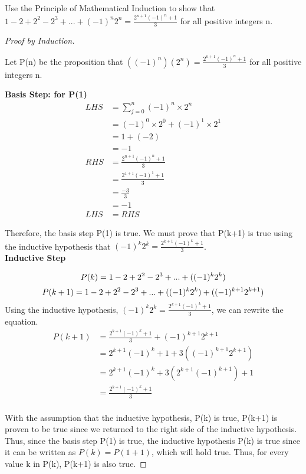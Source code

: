 \documentclass[12pt]{article}
\newenvironment{exercise}[2][Exercise]{\begin{trivlist}
\item[\hskip \labelsep {\bfseries #1}\hskip \labelsep {\bfseries #2.}]}{\end{trivlist}}
\begin{document}
\begin{exercise}{4}
Use the Principle of Mathematical Induction to show that $1 - 2+2^2 - 2^3 + ... + (-1)^n 2^n = \frac{2^{n+1} (-1)^n +1}{3}$ for all positive integers n.
\end{exercise}

\begin{proof}[Proof by Induction]
\textbf{\\}

Let P(n) be the proposition that $((-1)^n)(2^n) = \frac{2^{n+1} (-1)^n +1}{3}$ for all positive integers n. 

\textbf{Basis Step: for P(1)} 
\begin{align*}
LHS &= \sum_{j=0}^{n}(-1)^n \times 2^n \\
&= (-1)^0 \times 2^0 + (-1)^1 \times 2^1 \\
&= 1 + (-2) \\
&= -1 \\
RHS &= \frac{2^{n+1}(-1)^n +1}{3} \\
&= \frac{2^{1+1}(-1)^1 + 1}{3} \\
&= \frac{-3}{3} \\
&= -1 \\
LHS &= RHS
\end{align*}

Therefore, the basis step P(1) is true. We must prove that P(k+1) is true using the inductive hypothesis that $(-1)^k 2^k = \frac{2^{k+1} (-1)^k +1}{3}$. 
\\
\textbf{Inductive Step}

$$P(k) = 1 - 2 + 2^2 - 2^3 + ... + ((-1)^k 2^k) \\$$
$$P(k+1) = 1 - 2 + 2^2 - 2^3 + ... + ((-1)^k 2^k) + ((-1)^{k+1} 2^{k+1}) \\$$
Using the inductive hypothesis, $(-1)^k 2^k = \frac{2^{k+1}(-1)^k+1}{3}$, we can rewrite the equation.
\\
\begin{align*}
P(k+1) &= \frac{2^{k+1}(-1)^k +1}{3} + (-1)^{k+1}2^{k+1} \\
&= 2^{k+1}(-1)^k + 1 + 3((-1)^{k+1}2^{k+1}) \\
&= 2^{k+1}(-1)^k + 3(2^{k+1}(-1)^{k+1}) + 1 \\
&= \frac{2^{k+1}(-1)^k + 1}{3} \\
\end{align*}

With the assumption that the inductive hypothesis, P(k) is true, P(k+1) is proven to be true since we returned to the right side of the inductive hypothesis. Thus, since the basis step P(1) is true, the inductive hypothesis P(k) is true since it can be written as $P(k) = P(1+1)$, which will hold true. Thus, for every value k in P(k), P(k+1) is also true.
\end{proof}
\end{document}
